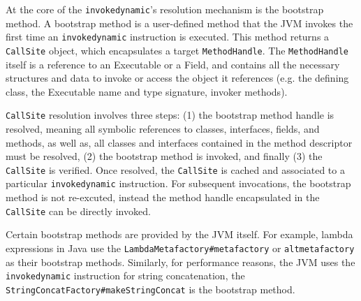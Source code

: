 At the core of the \verb|invokedynamic|'s resolution mechanism is the bootstrap method. A bootstrap method is a user-defined method that the JVM invokes the first time an \verb|invokedynamic| instruction is executed. 
This method returns a \verb|CallSite| object, which encapsulates a target \verb|MethodHandle|. The \verb|MethodHandle| itself is a reference to an Executable or a Field, and contains all the necessary structures and data to invoke or access the object it references (e.g. the defining class, the Executable name and type signature, invoker methods). 

\verb|CallSite| resolution involves three steps: (1) the bootstrap method handle is resolved, meaning all symbolic references to classes, interfaces, fields, and methods, as well as, all classes and interfaces contained in the method descriptor must be resolved, (2) the bootstrap method is invoked, and finally (3) the \verb|CallSite| is verified.
Once resolved, the \verb|CallSite| is cached and associated to a particular \verb|invokedynamic| instruction.
For subsequent invocations, the bootstrap method is not re-excuted, instead the method handle encapsulated in the \verb|CallSite| can be directly invoked.

Certain bootstrap methods are provided by the JVM itself. For example, lambda expressions in Java use the \verb|LambdaMetafactory#metafactory| or \verb|altmetafactory| as their bootstrap methods. Similarly, for performance reasons, the JVM uses the \verb|invokedynamic| instruction for string concatenation, the \verb|StringConcatFactory#makeStringConcat| is the bootstrap method.



